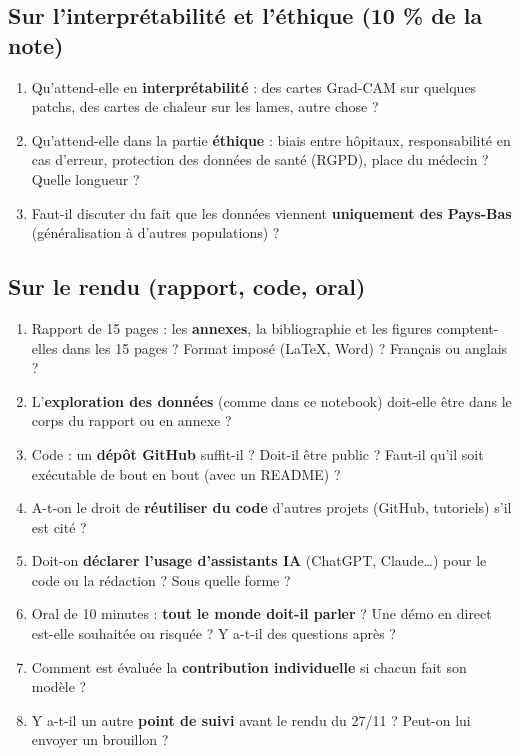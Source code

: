 \documentclass[11pt,a4paper]{article}
\begin{document}
\subsection*{Sur l'interprétabilité et l'éthique (10 \% de la note)}
\begin{enumerate}[label=\textbf{Q\arabic*.},resume]
  \item Qu'attend-elle en \textbf{interprétabilité} : des cartes Grad-CAM sur quelques patchs, des cartes de
        chaleur sur les lames, autre chose ?
  \item Qu'attend-elle dans la partie \textbf{éthique} : biais entre hôpitaux, responsabilité en cas
        d'erreur, protection des données de santé (RGPD), place du médecin ? Quelle longueur ?
  \item Faut-il discuter du fait que les données viennent \textbf{uniquement des Pays-Bas} (généralisation à
        d'autres populations) ?
\end{enumerate}

\subsection*{Sur le rendu (rapport, code, oral)}
\begin{enumerate}[label=\textbf{Q\arabic*.},resume]
  \item Rapport de 15 pages : les \textbf{annexes}, la bibliographie et les figures comptent-elles dans les
        15 pages ? Format imposé (LaTeX, Word) ? Français ou anglais ?
  \item L'\textbf{exploration des données} (comme dans ce notebook) doit-elle être dans le corps du rapport ou
        en annexe ?
  \item Code : un \textbf{dépôt GitHub} suffit-il ? Doit-il être public ? Faut-il qu'il soit exécutable de bout
        en bout (avec un README) ?
  \item A-t-on le droit de \textbf{réutiliser du code} d'autres projets (GitHub, tutoriels) s'il est cité ?
  \item Doit-on \textbf{déclarer l'usage d'assistants IA} (ChatGPT, Claude…) pour le code ou la rédaction ?
        Sous quelle forme ?
  \item Oral de 10 minutes : \textbf{tout le monde doit-il parler} ? Une démo en direct est-elle souhaitée ou
        risquée ? Y a-t-il des questions après ?
  \item Comment est évaluée la \textbf{contribution individuelle} si chacun fait son modèle ?
  \item Y a-t-il un autre \textbf{point de suivi} avant le rendu du 27/11 ? Peut-on lui envoyer un brouillon ?
\end{enumerate}
\end{document}
